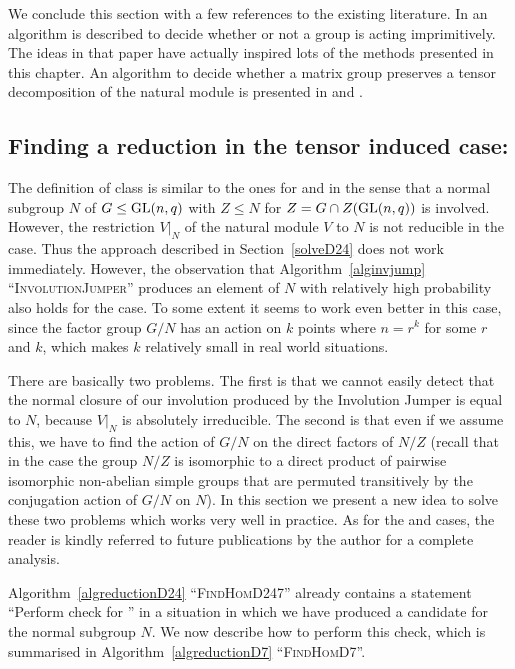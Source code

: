 \smallskip
We conclude this section with a few references to the existing
literature. In \cite{smashnormal} an algorithm is described to decide
whether or not a group is acting imprimitively. The ideas in that
paper have actually inspired lots of the methods presented in this
chapter. An algorithm to decide whether a matrix group preserves a
tensor decomposition of the natural module is presented in
\cite{tensprodproj} and \cite{LGO97}.


\subsection{Finding a reduction in the tensor induced case: }
\label{solveD7}

The definition of class  is similar to the ones for  and  in
the sense that a normal subgroup $N$ of $G \le \GL(n,q)$ with $Z \le N$
for $Z = G \cap Z(\GL(n,q))$ is involved.
However, the restriction $V|_N$ of the natural module $V$ to $N$ is not
reducible in the  case. Thus the approach described in
Section~\ref{solveD24} does not work immediately. However, the observation
that Algorithm~\ref{alginvjump} ``\textsc{InvolutionJumper}'' produces an
element of $N$ with relatively high probability also holds for the 
case. To some extent it seems to work even better in this case, since the 
factor group $G/N$ has an action on $k$ points where $n=r^k$ for some $r$
and $k$, which makes $k$ relatively small in real world situations.

There are basically two problems. The first is that we cannot easily detect 
that the normal closure of our involution produced by the Involution
Jumper is equal to $N$, because $V|_N$ is absolutely irreducible. The
second is that even if we assume this, we have to find the action of $G/N$ on
the direct factors of $N/Z$ (recall that in the  case the group $N/Z$
is isomorphic to a direct product of pairwise isomorphic non-abelian simple
groups that are permuted transitively by the conjugation action of $G/N$ on
$N$). In this section we present a new idea to solve these two problems
which works very well in practice. As for the  and  cases, the reader is
kindly referred to future publications by the author for a complete analysis.

Algorithm~\ref{algreductionD24} ``\textsc{FindHomD247}'' already contains a 
statement ``Perform check for '' in a situation in which we have produced
a candidate for the normal subgroup $N$. We now describe how to perform
this check, which is summarised in Algorithm~\ref{algreductionD7}
``\textsc{FindHomD7}''.
%

